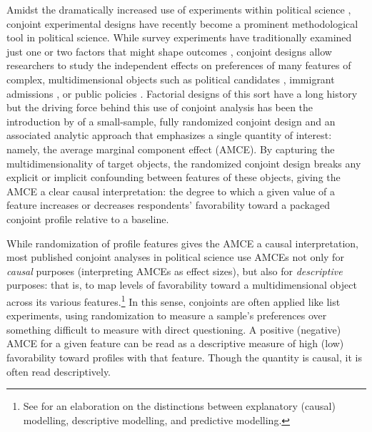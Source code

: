 \documentclass[a4paper,12pt]{article}\usepackage[]{graphicx}\usepackage[]{color}
\begin{document}
Amidst the dramatically increased use of experiments within political science \citep{Druckmanetal2006, Mutz2011}, conjoint experimental designs have recently become a prominent methodological tool in political science. While survey experiments have traditionally examined just one or two factors that might shape outcomes \citep[see, for reviews,][]{GainesKuklinskiQuirk2007, Sniderman2011}, conjoint designs allow researchers to study the independent effects on preferences of many features of complex, multidimensional objects such as political candidates \citep{Campbelletal2016, TeeleKallaRosenbluth2018}, immigrant admissions \citep{HainmuellerHopkins2015, BansakHainmuellerHangartner2016, WrightLevyCitrin2016}, or public policies \citep{GallegoMarx2017, Hankinson2018}. Factorial designs of this sort have a long history but the driving force behind this use of conjoint analysis has been the introduction by \citet{HainmuellerHopkinsYamamoto2014} of a small-sample, fully randomized conjoint design and an associated analytic approach that emphasizes a single quantity of interest: namely, the average marginal component effect (AMCE). By capturing the multidimensionality of target objects, the randomized conjoint design breaks any explicit or implicit confounding between features of these objects, giving the AMCE a clear causal interpretation: the degree to which a given value of a feature increases or decreases respondents' favorability toward a packaged conjoint profile relative to a baseline. 

While randomization of profile features gives the AMCE a causal interpretation, most published conjoint analyses in political science use AMCEs not only for \textit{causal} purposes (interpreting AMCEs as effect sizes), but also for \textit{descriptive} purposes: that is, to map levels of favorability toward a multidimensional object across its various features.\footnote{See \citet{Shmueli2010} for an elaboration on the distinctions between explanatory (causal) modelling, descriptive modelling, and predictive modelling.} In this sense, conjoints are often applied like list experiments, using randomization to measure a sample's preferences over something difficult to measure with direct questioning. A positive (negative) AMCE for a given feature can be read as a descriptive measure of high (low) favorability toward profiles with that feature. Though the quantity is causal, it is often read descriptively.
\end{document}

